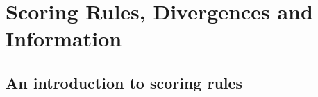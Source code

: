 \part{Scoring Rules, Divergences and Information\label{part:1}}

\chapter{An introduction to scoring rules\label{sec:scoring_rules}}


% 